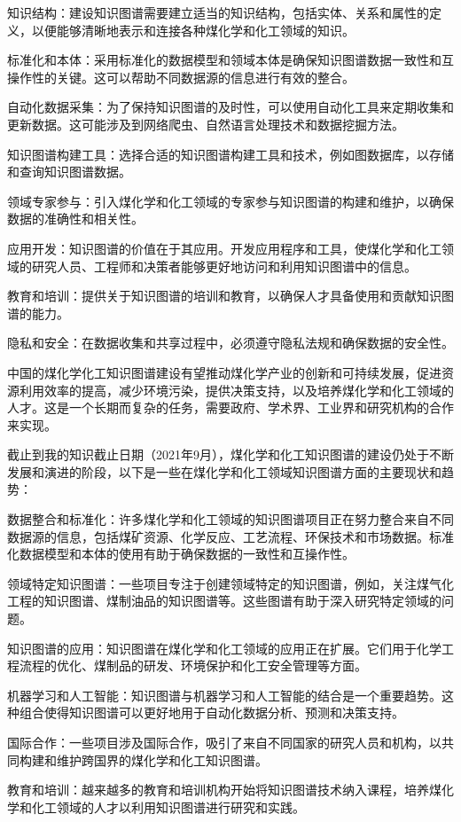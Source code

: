 知识结构：建设知识图谱需要建立适当的知识结构，包括实体、关系和属性的定义，以便能够清晰地表示和连接各种煤化学和化工领域的知识。

标准化和本体：采用标准化的数据模型和领域本体是确保知识图谱数据一致性和互操作性的关键。这可以帮助不同数据源的信息进行有效的整合。

自动化数据采集：为了保持知识图谱的及时性，可以使用自动化工具来定期收集和更新数据。这可能涉及到网络爬虫、自然语言处理技术和数据挖掘方法。

知识图谱构建工具：选择合适的知识图谱构建工具和技术，例如图数据库，以存储和查询知识图谱数据。

领域专家参与：引入煤化学和化工领域的专家参与知识图谱的构建和维护，以确保数据的准确性和相关性。

应用开发：知识图谱的价值在于其应用。开发应用程序和工具，使煤化学和化工领域的研究人员、工程师和决策者能够更好地访问和利用知识图谱中的信息。

教育和培训：提供关于知识图谱的培训和教育，以确保人才具备使用和贡献知识图谱的能力。

隐私和安全：在数据收集和共享过程中，必须遵守隐私法规和确保数据的安全性。

中国的煤化学化工知识图谱建设有望推动煤化学产业的创新和可持续发展，促进资源利用效率的提高，减少环境污染，提供决策支持，以及培养煤化学和化工领域的人才。这是一个长期而复杂的任务，需要政府、学术界、工业界和研究机构的合作来实现。

截止到我的知识截止日期（2021年9月），煤化学和化工知识图谱的建设仍处于不断发展和演进的阶段，以下是一些在煤化学和化工领域知识图谱方面的主要现状和趋势：

数据整合和标准化：许多煤化学和化工领域的知识图谱项目正在努力整合来自不同数据源的信息，包括煤矿资源、化学反应、工艺流程、环保技术和市场数据。标准化数据模型和本体的使用有助于确保数据的一致性和互操作性。

领域特定知识图谱：一些项目专注于创建领域特定的知识图谱，例如，关注煤气化工程的知识图谱、煤制油品的知识图谱等。这些图谱有助于深入研究特定领域的问题。

知识图谱的应用：知识图谱在煤化学和化工领域的应用正在扩展。它们用于化学工程流程的优化、煤制品的研发、环境保护和化工安全管理等方面。

机器学习和人工智能：知识图谱与机器学习和人工智能的结合是一个重要趋势。这种组合使得知识图谱可以更好地用于自动化数据分析、预测和决策支持。

国际合作：一些项目涉及国际合作，吸引了来自不同国家的研究人员和机构，以共同构建和维护跨国界的煤化学和化工知识图谱。

教育和培训：越来越多的教育和培训机构开始将知识图谱技术纳入课程，培养煤化学和化工领域的人才以利用知识图谱进行研究和实践。

